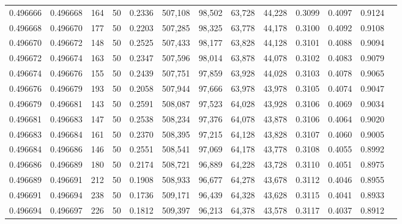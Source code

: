 \begin{tabular}{rrrrrrrrrrrrr}
0.496666 & 0.496668 &   164 &  50 &                                     0.2336 & 507,108 &  98,502 &  63,728 &  44,228 & 0.3099 & 0.4097 & 0.9124 \\
0.496668 & 0.496670 &   177 &  50 &                                     0.2203 & 507,285 &  98,325 &  63,778 &  44,178 & 0.3100 & 0.4092 & 0.9108 \\
0.496670 & 0.496672 &   148 &  50 &                                     0.2525 & 507,433 &  98,177 &  63,828 &  44,128 & 0.3101 & 0.4088 & 0.9094 \\
0.496672 & 0.496674 &   163 &  50 &                                     0.2347 & 507,596 &  98,014 &  63,878 &  44,078 & 0.3102 & 0.4083 & 0.9079 \\
0.496674 & 0.496676 &   155 &  50 &                                     0.2439 & 507,751 &  97,859 &  63,928 &  44,028 & 0.3103 & 0.4078 & 0.9065 \\
0.496676 & 0.496679 &   193 &  50 &                                     0.2058 & 507,944 &  97,666 &  63,978 &  43,978 & 0.3105 & 0.4074 & 0.9047 \\
0.496679 & 0.496681 &   143 &  50 &                                     0.2591 & 508,087 &  97,523 &  64,028 &  43,928 & 0.3106 & 0.4069 & 0.9034 \\
0.496681 & 0.496683 &   147 &  50 &                                     0.2538 & 508,234 &  97,376 &  64,078 &  43,878 & 0.3106 & 0.4064 & 0.9020 \\
0.496683 & 0.496684 &   161 &  50 &                                     0.2370 & 508,395 &  97,215 &  64,128 &  43,828 & 0.3107 & 0.4060 & 0.9005 \\
0.496684 & 0.496686 &   146 &  50 &                                     0.2551 & 508,541 &  97,069 &  64,178 &  43,778 & 0.3108 & 0.4055 & 0.8992 \\
0.496686 & 0.496689 &   180 &  50 &                                     0.2174 & 508,721 &  96,889 &  64,228 &  43,728 & 0.3110 & 0.4051 & 0.8975 \\
0.496689 & 0.496691 &   212 &  50 &                                     0.1908 & 508,933 &  96,677 &  64,278 &  43,678 & 0.3112 & 0.4046 & 0.8955 \\
0.496691 & 0.496694 &   238 &  50 &                                     0.1736 & 509,171 &  96,439 &  64,328 &  43,628 & 0.3115 & 0.4041 & 0.8933 \\
0.496694 & 0.496697 &   226 &  50 &                                     0.1812 & 509,397 &  96,213 &  64,378 &  43,578 & 0.3117 & 0.4037 & 0.8912 \\

\end{tabular}
